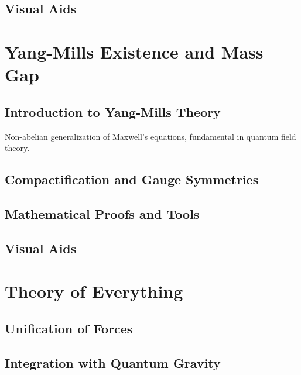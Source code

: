\documentclass[12pt, a4paper]{article}
\theoremstyle{definitionstyle}
\begin{document}
\subsection{Visual Aids}

\section{Yang-Mills Existence and Mass Gap}
\subsection{Introduction to Yang-Mills Theory}
\begin{definition}
Non-abelian generalization of Maxwell's equations, fundamental in quantum field theory.
\end{definition}

\subsection{Compactification and Gauge Symmetries}

\subsection{Mathematical Proofs and Tools}

\subsection{Visual Aids}

\section{Theory of Everything}
\subsection{Unification of Forces}

\subsection{Integration with Quantum Gravity}
\end{document}
